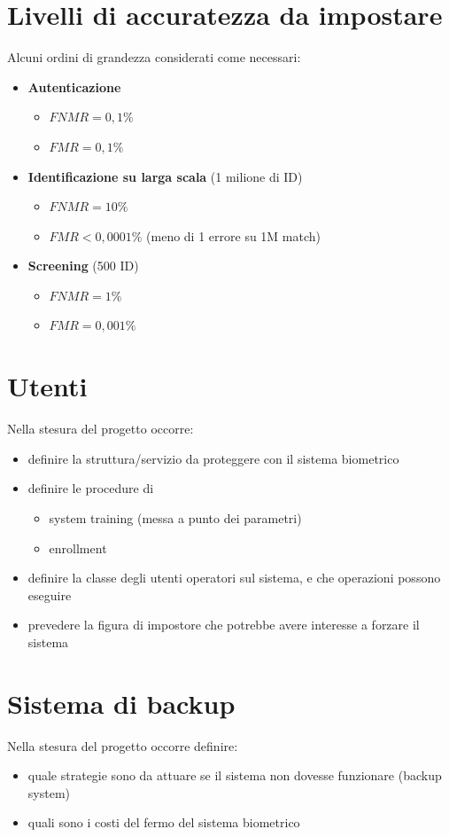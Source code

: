 \documentclass{report}
\begin{document}
\newpage
\section{Livelli di accuratezza da impostare}
Alcuni ordini di grandezza considerati come necessari:
\begin{itemize}
    \item \textbf{Autenticazione}
    \begin{itemize}
        \item $FNMR = 0,1\%$
        \item $FMR = 0,1\%$
    \end{itemize}
    \item \textbf{Identificazione su larga scala} (1 milione di ID)
    \begin{itemize}
        \item $FNMR = 10\%$
        \item $FMR < 0,0001\%$ (meno di 1 errore su 1M match)
    \end{itemize}
    \item \textbf{Screening} (500 ID)
    \begin{itemize}
        \item $FNMR = 1\%$
        \item $FMR = 0,001\%$
    \end{itemize}
\end{itemize}

\section{Utenti}
Nella stesura del progetto occorre:
\begin{itemize}
    \item definire la struttura/servizio da proteggere con il sistema biometrico 
    \item definire le procedure di
    \begin{itemize}
        \item system training (messa a punto dei parametri)
        \item enrollment 
    \end{itemize}
    \item definire la classe degli utenti operatori sul sistema, e che operazioni possono eseguire
    \item prevedere la figura di impostore che potrebbe avere interesse a forzare il sistema
\end{itemize}

\section{Sistema di backup}
Nella stesura del progetto occorre definire:
\begin{itemize}
    \item quale strategie sono da attuare se il sistema non dovesse funzionare (backup system)
    \item quali sono i costi del fermo del sistema biometrico 
\end{itemize}
\end{document}
